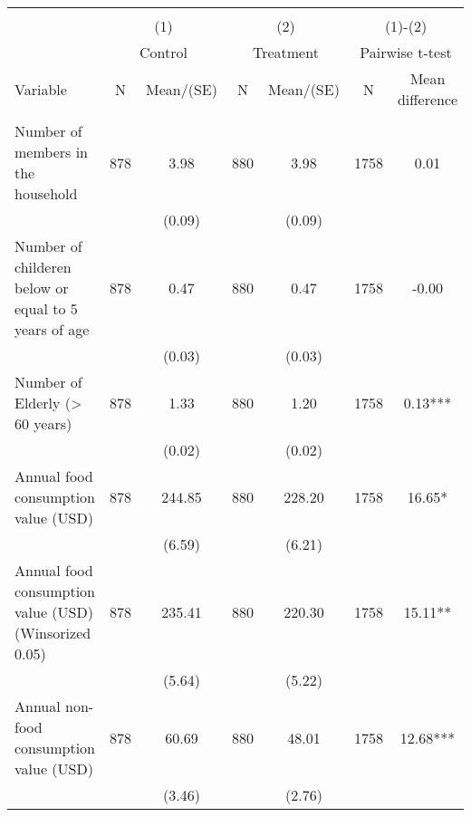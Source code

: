 
\begin{tabular}{@{\extracolsep{5pt}}lcccccc}
\\[-1.8ex]\hline \hline \\[-1.8ex]
 & \multicolumn{2}{c}{(1)}  & \multicolumn{2}{c}{(2)}  & \multicolumn{2}{c}{(1)-(2)} \\
 & \multicolumn{2}{c}{Control}  & \multicolumn{2}{c}{Treatment}  & \multicolumn{2}{c}{Pairwise t-test}  \\
Variable & N & Mean/(SE) & N & Mean/(SE) & N & Mean difference \\ \hline \\[-1.8ex] 
Number of members in the household   & 878    & 3.98    & 880    & 3.98    & 1758    & 0.01   \\
 &   & (0.09)  &   & (0.09)  &   &  \\ [1ex]
Number of childeren below or equal to 5 years of age   & 878    & 0.47    & 880    & 0.47    & 1758    & -0.00   \\
 &   & (0.03)  &   & (0.03)  &   &  \\ [1ex]
Number of Elderly (> 60 years)   & 878    & 1.33    & 880    & 1.20    & 1758    & 0.13***   \\
 &   & (0.02)  &   & (0.02)  &   &  \\ [1ex]
Annual food consumption value (USD)   & 878    & 244.85    & 880    & 228.20    & 1758    & 16.65*   \\
 &   & (6.59)  &   & (6.21)  &   &  \\ [1ex]
Annual food consumption value (USD) (Winsorized 0.05)   & 878    & 235.41    & 880    & 220.30    & 1758    & 15.11**   \\
 &   & (5.64)  &   & (5.22)  &   &  \\ [1ex]
Annual non-food consumption value (USD)   & 878    & 60.69    & 880    & 48.01    & 1758    & 12.68***   \\
 &   & (3.46)  &   & (2.76)  &   &  \\ [1ex]

\end{tabular}
